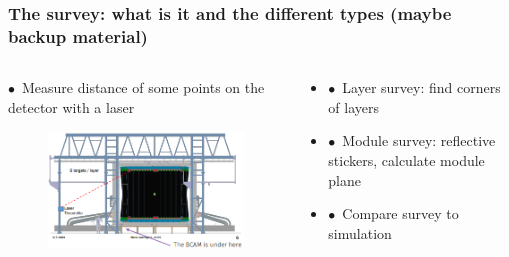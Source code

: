 \documentclass[aspectratio=1610, 12pt, xcolor=dvipsnames]{beamer}
\begin{document}
\begin{frame}\frametitle{The survey: what is it and the different types (maybe backup material)}
  \begin{columns}
    \begin{column}[c]{0.48\textwidth}
      $\bullet$\, Measure distance of some points on the detector with a laser
      \begin{figure}
        \centering
        \includegraphics[width=\textwidth]{logos/survey.png}
      \end{figure}
    \end{column}
    \begin{column}[c]{0.48\textwidth}
      \begin{itemize}
        \item $\bullet$\, Layer survey: find corners of layers
        \item $\bullet$\, Module survey: reflective stickers, calculate module plane
        \item $\bullet$\, Compare survey to simulation
      \end{itemize}
    \end{column}
  \end{columns}
\end{frame}
\end{document}

